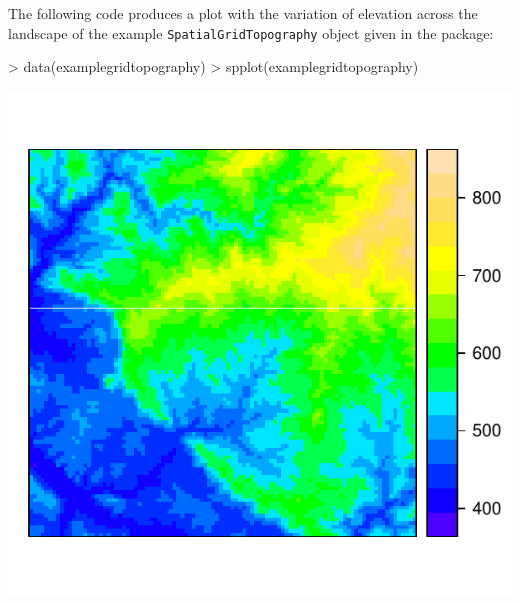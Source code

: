 \documentclass[11pt,a4paper]{article}
\begin{document}
The following code produces a plot with the variation of elevation across the landscape of the example \texttt{SpatialGridTopography} object given in the package:
\begin{center}
\begin{Schunk}
\begin{Sinput}
> data(examplegridtopography)
> spplot(examplegridtopography)
\end{Sinput}
\end{Schunk}
\includegraphics{Meteorology-004}
\end{center}
\end{document}
